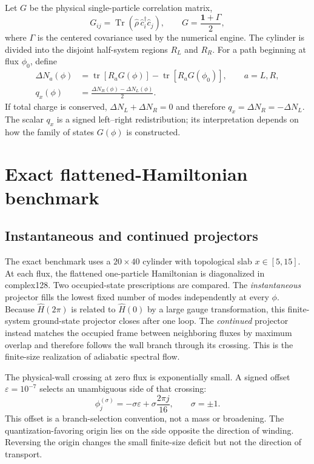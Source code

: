 \documentclass[aps,prb,twocolumn,floatfix,nofootinbib,superscriptaddress]{revtex4-2}
\newcommand{\tr}{\operatorname{tr}}
\newcommand{\Geng}{\Gamma}
\begin{document}
Let $G$ be the physical single-particle correlation matrix,
\begin{equation}
  G_{ij}=\operatorname{Tr}
  (\hat\rho\,\hat c_i^\dagger\hat c_j),
  \qquad
  G=\frac{\mathbf{1}+\Geng}{2},
\end{equation}
where $\Geng$ is the centered covariance used by the numerical engine.  The
cylinder is divided into the disjoint half-system regions $R_L$ and $R_R$.
For a path beginning at flux $\phi_0$, define
\begin{align}
  \Delta N_a(\phi)&=\tr[R_aG(\phi)]-\tr[R_aG(\phi_0)],
  \qquad a=L,R,\\
  q_x(\phi)&=\frac{\Delta N_R(\phi)-\Delta N_L(\phi)}{2}.
  \label{eq:qx}
\end{align}
If total charge is conserved, $\Delta N_L+\Delta N_R=0$ and therefore
$q_x=\Delta N_R=-\Delta N_L$.  The scalar $q_x$ is a signed left--right
redistribution; its interpretation depends on how the family of states
$G(\phi)$ is constructed.

\section{Exact flattened-Hamiltonian benchmark}

\subsection{Instantaneous and continued projectors}

The exact benchmark uses a $20\times40$ cylinder with topological slab
$x\in[5,15]$.  At each flux, the flattened one-particle Hamiltonian is
diagonalized in complex128.  Two occupied-state prescriptions are compared.
The \emph{instantaneous} projector fills the lowest fixed number of modes
independently at every $\phi$.  Because $\hat H(2\pi)$ is related to
$\hat H(0)$ by a large gauge transformation, this finite-system ground-state
projector closes after one loop.  The \emph{continued} projector instead
matches the occupied frame between neighboring fluxes by maximum overlap and
therefore follows the wall branch through its crossing.  This is the
finite-size realization of adiabatic spectral flow.

The physical-wall crossing at zero flux is exponentially small.  A signed
offset $\varepsilon=10^{-7}$ selects an unambiguous side of that crossing:
\begin{equation}
  \phi_j^{(\sigma)}=-\sigma\varepsilon
  +\sigma\frac{2\pi j}{16},
  \qquad \sigma=\pm1.
  \label{eq:regulated-grid}
\end{equation}
This offset is a branch-selection convention, not a mass or broadening.  The
quantization-favoring origin lies on the side opposite the direction of
winding.  Reversing the origin changes the small finite-size deficit but not
the direction of transport.
\end{document}
